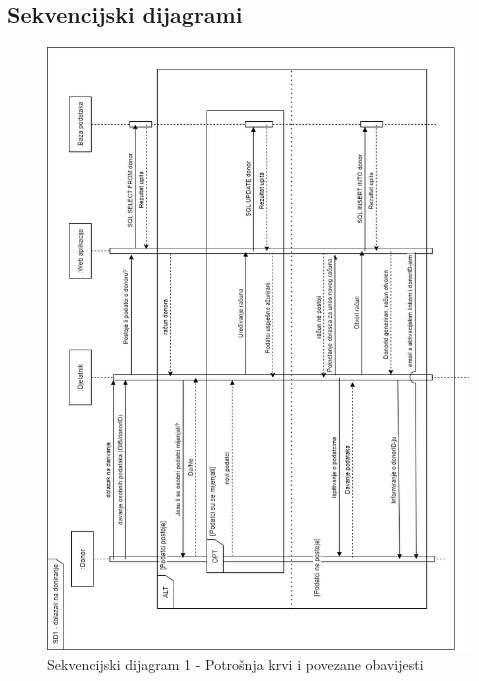 				\eject		
				
			\subsection{Sekvencijski dijagrami}
				
				
				
				
				\begin{figure}[H]
    			\includegraphics[scale=0.7]{slike/SD1_rot.png} %
    			\centering
    			\caption{Sekvencijski dijagram 1 - Potrošnja krvi i povezane obavijesti}
    			\label{fig:promjene}
    	    	\end{figure}
    	    	
